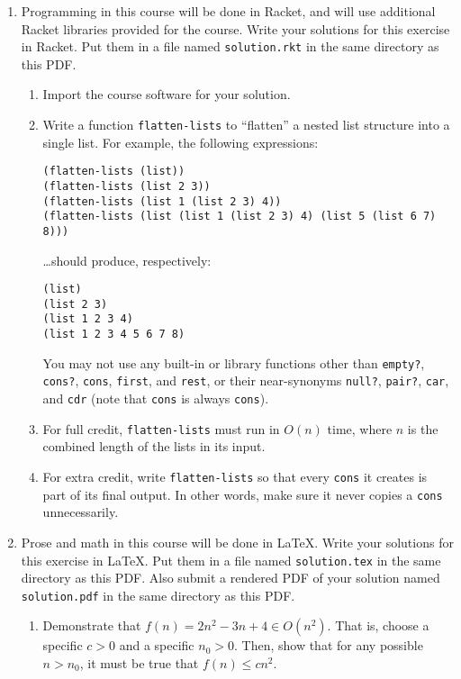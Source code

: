 \documentclass{article}
\begin{document}
\begin{enumerate}
\pagebreak[1]
\item
  Programming in this course will be done in Racket, and will use additional
  Racket libraries provided for the course.  Write your solutions for this
  exercise in Racket.  Put them in a file named \texttt{solution.rkt} in the
  same directory as this PDF.
  \begin{enumerate}
  \item
    Import the course software for your solution.
  \item
    Write a function \texttt{flatten-lists} to ``flatten'' a nested list
    structure into a single list.  For example, the following expressions:
    \begin{verbatim}
(flatten-lists (list))
(flatten-lists (list 2 3))
(flatten-lists (list 1 (list 2 3) 4))
(flatten-lists (list (list 1 (list 2 3) 4) (list 5 (list 6 7) 8))) \end{verbatim}
    \dots should produce, respectively:
    \begin{verbatim}
(list)
(list 2 3)
(list 1 2 3 4)
(list 1 2 3 4 5 6 7 8) \end{verbatim}
    You may not use any built-in or library functions other than
    \texttt{empty?}, \texttt{cons?}, \texttt{cons}, \texttt{first},
    and \texttt{rest}, or their near-synonyms \texttt{null?}, \texttt{pair?}, 
    \texttt{car}, and \texttt{cdr} (note that \texttt{cons} is always
    \texttt{cons}).
  \item
    For full credit, \texttt{flatten-lists} must run in \(O(n)\) time, where
    \(n\) is the combined length of the lists in its input.
  \item
    For extra credit, write \texttt{flatten-lists} so that every \texttt{cons}
    it creates is part of its final output.  In other words, make sure it never
    copies a \texttt{cons} unnecessarily.
  \end{enumerate}

\pagebreak[1]
\item
  Prose and math in this course will be done in \LaTeX{}.  Write your solutions
  for this exercise in \LaTeX{}.  Put them in a file named \texttt{solution.tex}
  in the same directory as this PDF.  Also submit a rendered PDF of your
  solution named \texttt{solution.pdf} in the same directory as this PDF.

  \begin{enumerate}

  \item Demonstrate that
    \(f(n) = 2n^2 - 3n + 4 \in O(n^2)\).
    That is, choose a specific \(c>0\) and a specific \(n_0 > 0\).
    Then, show that for any possible \(n > n_0\), it must be true that
    \(f(n) \leq c n^2\).


\end{enumerate}
\end{enumerate}
\end{document}
